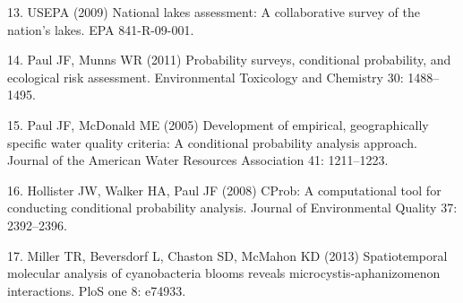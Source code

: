 \documentclass[11pt,]{article}
\begin{document}
13. USEPA (2009) National lakes assessment: A collaborative survey of
the nation's lakes. EPA 841-R-09-001.

14. Paul JF, Munns WR (2011) Probability surveys, conditional
probability, and ecological risk assessment. Environmental Toxicology
and Chemistry 30: 1488--1495.

15. Paul JF, McDonald ME (2005) Development of empirical, geographically
specific water quality criteria: A conditional probability analysis
approach. Journal of the American Water Resources Association 41:
1211--1223.

16. Hollister JW, Walker HA, Paul JF (2008) CProb: A computational tool
for conducting conditional probability analysis. Journal of
Environmental Quality 37: 2392--2396.

17. Miller TR, Beversdorf L, Chaston SD, McMahon KD (2013)
Spatiotemporal molecular analysis of cyanobacteria blooms reveals
microcystis-aphanizomenon interactions. PloS one 8: e74933.
\end{document}
